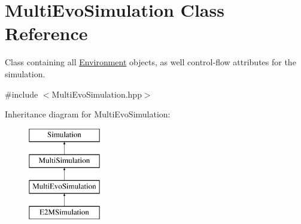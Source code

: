 \hypertarget{classMultiEvoSimulation}{}\section{Multi\+Evo\+Simulation Class Reference}
\label{classMultiEvoSimulation}


Class containing all \hyperlink{classEnvironment}{Environment} objects, as well control-\/flow attributes for the simulation.  




{\ttfamily \#include $<$Multi\+Evo\+Simulation.\+hpp$>$}

Inheritance diagram for Multi\+Evo\+Simulation\+:\begin{figure}[H]
\begin{center}
\leavevmode
\includegraphics[height=4.000000cm]{classMultiEvoSimulation}
\end{center}
\end{figure}
